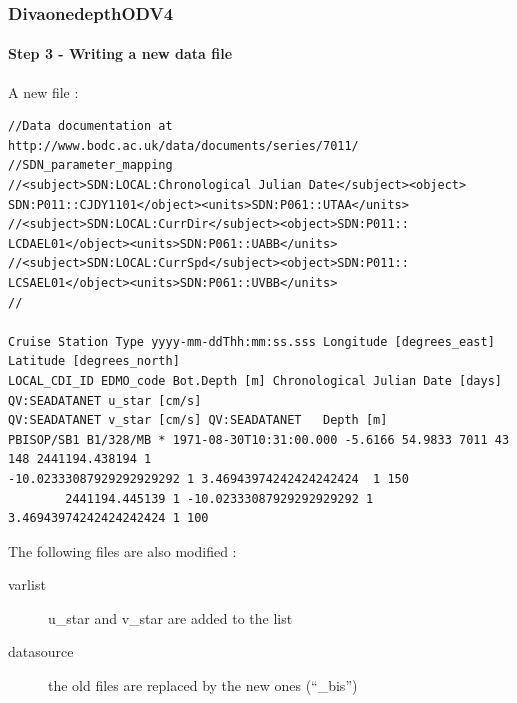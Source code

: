 \begin{frame}[fragile]
\frametitle{DivaonedepthODV4}
\framesubtitle{Step 3 - Writing a new data file}
A new file :
~\\
\begin{changemargin}{-0.9cm}{0cm}
\begin{tiny}
\begin{verbatim}
//Data documentation at http://www.bodc.ac.uk/data/documents/series/7011/
//SDN_parameter_mapping
//<subject>SDN:LOCAL:Chronological Julian Date</subject><object>
SDN:P011::CJDY1101</object><units>SDN:P061::UTAA</units>
//<subject>SDN:LOCAL:CurrDir</subject><object>SDN:P011::
LCDAEL01</object><units>SDN:P061::UABB</units>
//<subject>SDN:LOCAL:CurrSpd</subject><object>SDN:P011::
LCSAEL01</object><units>SDN:P061::UVBB</units>
//

Cruise Station Type yyyy-mm-ddThh:mm:ss.sss Longitude [degrees_east] Latitude [degrees_north] 
LOCAL_CDI_ID EDMO_code Bot.Depth [m] Chronological Julian Date [days] QV:SEADATANET u_star [cm/s]
QV:SEADATANET v_star [cm/s] QV:SEADATANET   Depth [m]
PBISOP/SB1 B1/328/MB * 1971-08-30T10:31:00.000 -5.6166 54.9833 7011 43 148 2441194.438194 1 
-10.02333087929292929292 1 3.46943974242424242424  1 150
        2441194.445139 1 -10.02333087929292929292 1 3.46943974242424242424 1 100
\end{verbatim} 
\end{tiny}
\end{changemargin}

\vspace{-1.2cm}
\hspace{4.5cm}
\vspace{1.2cm}

\vspace{-1.25cm}
\hspace{5.6cm}
\vspace{1.25cm}

\vspace{-1.45cm}
\hspace{8.65cm}
\vspace{0.8cm}

The following files are also modified :
\begin{description}
 \item[varlist]u\_star and v\_star are added to the list
 \item[datasource]the old files are replaced by the new ones (``\_bis'')
\end{description}
\end{frame}
